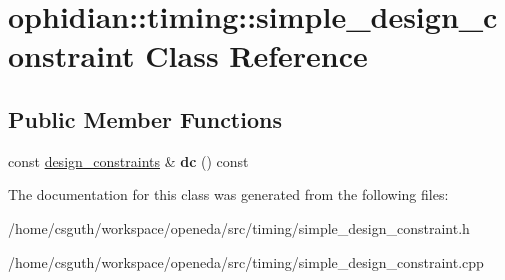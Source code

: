 \hypertarget{classophidian_1_1timing_1_1simple__design__constraint}{\section{ophidian\-:\-:timing\-:\-:simple\-\_\-design\-\_\-constraint Class Reference}
\label{classophidian_1_1timing_1_1simple__design__constraint}
}
\subsection*{Public Member Functions}
\begin{DoxyCompactItemize}
\item 
\hypertarget{classophidian_1_1timing_1_1simple__design__constraint_addeba923b2f0e7ee29585c2d0800a06d}{const \hyperlink{structophidian_1_1timing_1_1design__constraints}{design\-\_\-constraints} \& {\bfseries dc} () const }\label{classophidian_1_1timing_1_1simple__design__constraint_addeba923b2f0e7ee29585c2d0800a06d}

\end{DoxyCompactItemize}


The documentation for this class was generated from the following files\-:\begin{DoxyCompactItemize}
\item 
/home/csguth/workspace/openeda/src/timing/simple\-\_\-design\-\_\-constraint.\-h\item 
/home/csguth/workspace/openeda/src/timing/simple\-\_\-design\-\_\-constraint.\-cpp\end{DoxyCompactItemize}
